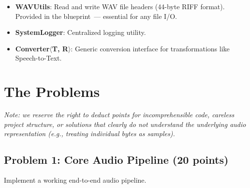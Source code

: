 \documentclass[a4paper,12pt]{article}
\begin{document}
\begin{itemize}
    \item \textbf{WAVUtils}: Read and write WAV file headers (44-byte RIFF format).
          Provided in the blueprint~--- essential for any file I/O.
    \item \textbf{SystemLogger}: Centralized logging utility.
    \item \textbf{Converter$\langle$T, R$\rangle$}: Generic conversion interface for transformations
          like Speech-to-Text.
\end{itemize}


\section{The Problems}

\textit{Note: we reserve the right to deduct points for incomprehensible code,
careless project structure, or solutions that clearly do not understand
the underlying audio representation (e.g., treating individual bytes as samples).}

\subsection{Problem 1: Core Audio Pipeline \hfill \textbf{(20 points)}}

Implement a working end-to-end audio pipeline.
\end{document}
